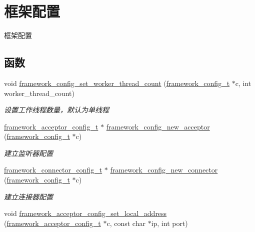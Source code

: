 \hypertarget{a00103}{}\section{框架配置}
\label{a00103}


框架配置  


\subsection*{函数}
\begin{DoxyCompactItemize}
\item 
void \hyperlink{a00103_ga46fc5d54c72138bced5ddd4068ef77e5_ga46fc5d54c72138bced5ddd4068ef77e5}{framework\+\_\+config\+\_\+set\+\_\+worker\+\_\+thread\+\_\+count} (\hyperlink{a00050_a55b26efa9e6ee05514d087ba2593a54b_a55b26efa9e6ee05514d087ba2593a54b}{framework\+\_\+config\+\_\+t} $\ast$c, int worker\+\_\+thread\+\_\+count)
\begin{DoxyCompactList}\small\item\em 设置工作线程数量，默认为单线程 \end{DoxyCompactList}\item 
\hyperlink{a00050_a61a4e424ff4c86631423dedd97c40064_a61a4e424ff4c86631423dedd97c40064}{framework\+\_\+acceptor\+\_\+config\+\_\+t} $\ast$ \hyperlink{a00103_ga74c94573fba40eb46f9e183fab029978_ga74c94573fba40eb46f9e183fab029978}{framework\+\_\+config\+\_\+new\+\_\+acceptor} (\hyperlink{a00050_a55b26efa9e6ee05514d087ba2593a54b_a55b26efa9e6ee05514d087ba2593a54b}{framework\+\_\+config\+\_\+t} $\ast$c)
\begin{DoxyCompactList}\small\item\em 建立监听器配置 \end{DoxyCompactList}\item 
\hyperlink{a00050_a81253f4c995b97e69be0e67f7a26097f_a81253f4c995b97e69be0e67f7a26097f}{framework\+\_\+connector\+\_\+config\+\_\+t} $\ast$ \hyperlink{a00103_ga4ff6334d19e68c08b5741ee7fed02f81_ga4ff6334d19e68c08b5741ee7fed02f81}{framework\+\_\+config\+\_\+new\+\_\+connector} (\hyperlink{a00050_a55b26efa9e6ee05514d087ba2593a54b_a55b26efa9e6ee05514d087ba2593a54b}{framework\+\_\+config\+\_\+t} $\ast$c)
\begin{DoxyCompactList}\small\item\em 建立连接器配置 \end{DoxyCompactList}\item 
void \hyperlink{a00103_ga5b3c778f37a4c667479d9eae877d3d67_ga5b3c778f37a4c667479d9eae877d3d67}{framework\+\_\+acceptor\+\_\+config\+\_\+set\+\_\+local\+\_\+address} (\hyperlink{a00050_a61a4e424ff4c86631423dedd97c40064_a61a4e424ff4c86631423dedd97c40064}{framework\+\_\+acceptor\+\_\+config\+\_\+t} $\ast$c, const char $\ast$ip, int port)

\end{DoxyCompactItemize}
